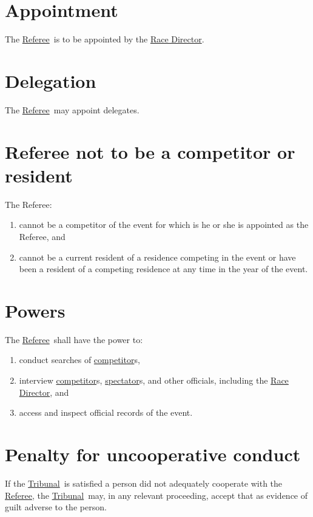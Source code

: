 \documentclass[12pt]{report}
\newcommand{\hyplink}[1]{\hyperlink{#1}{{#1}}}
\newcommand{\competitor}{\hyplink{competitor}}
\newcommand{\RaceDirector}{\hyplink{Race Director}}
\newcommand{\Referee}{\hyplink{Referee}}
\newcommand{\spectator}{\hyplink{spectator}}
\newcommand{\Tribunal}{\hyplink{Tribunal}}
\begin{document}
  \section{Appointment}
  \begin{fenumerate}
    \item The \Referee\ is to be appointed by the \RaceDirector.
  \end{fenumerate}
  \section{Delegation}
  \begin{fenumerate}
    \item The \Referee\ may appoint delegates.
  \end{fenumerate}
  \section{Referee not to be a competitor or resident}
  \begin{fenumerate}
  \item
  The Referee:
  \begin{enumerate}
    \item cannot be a competitor of the event for which is he or she is appointed as the Referee, and
    \item cannot be a current resident of a residence competing in the event or have been a resident of a competing residence at any time in the year of the event.
  \end{enumerate}
  \end{fenumerate}
  \section{Powers}
  \begin{fenumerate}
    \item The \Referee\ shall have the power to:
    \begin{enumerate}
      \item conduct searches of \competitor s,
      \item interview \competitor s, \spectator s, and other officials, including the \RaceDirector, and
      \item access and inspect official records of the event.
    \end{enumerate}
  \end{fenumerate}
  \section{Penalty for uncooperative conduct}
  \begin{fenumerate}
    \item If the \Tribunal\ is satisfied a person did not adequately cooperate with the \Referee, the \Tribunal\ may, in any relevant proceeding, accept that as evidence of guilt adverse to the person.
  \end{fenumerate}
\end{document}

